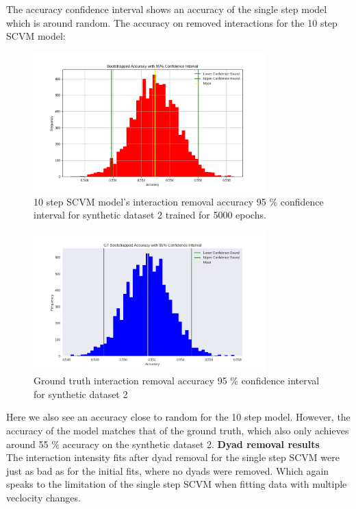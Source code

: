 \noindent
The accuracy confidence interval shows an accuracy of the single step model which is around random. 
\clearpage
\vspace*{-2cm}
The accuracy on removed interactions for the 10 step SCVM model:
\begin{figure}[H]
    \centering
    \includegraphics[width=0.8\textwidth]{0_images/10step_SCVM_Accuracy_Plot.png}
    \caption{10 step SCVM model's interaction removal accuracy 95 \% confidence interval for synthetic dataset 2 trained for 5000 epochs.}
    \label{fig:RQ1:SCVM_accuracy}
\end{figure}
\begin{figure}[H]
    \centering
    \includegraphics[width=0.8\textwidth]{0_images/10step_SCVM_GT_Accuracy_Plot.png}
    \caption{Ground truth interaction removal accuracy 95 \% confidence interval for synthetic dataset 2}
\end{figure}
\noindent
Here we also see an accuracy close to random for the 10 step model. However, the accuracy of the model matches that of the ground truth, which also only achieves around 55 \% accuracy on the synthetic dataset 2.
\clearpage
\vspace*{-2cm}
\noindent
\textbf{Dyad removal results}
\\
The interaction intensity fits after dyad removal for the single step SCVM were just as bad as for the initial fits, where no dyads were removed. Which again speaks to the limitation of the single step SCVM when fitting data with multiple veclocity changes. 
